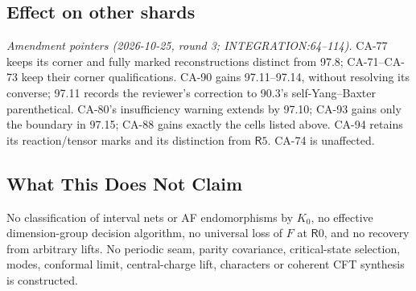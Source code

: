 \subsection{Effect on other shards}
\emph{Amendment pointers (2026-10-25, round 3; INTEGRATION:64--114).} CA-77 keeps its corner and fully marked
reconstructions distinct from 97.8; CA-71--CA-73 keep their corner qualifications. CA-90 gains 97.11--97.14,
without resolving its converse; 97.11 records the reviewer's correction to 90.3's self-Yang--Baxter parenthetical.
CA-80's insufficiency warning extends by 97.10; CA-93 gains only the boundary in 97.15; CA-88 gains exactly the
cells listed above. CA-94 retains its reaction/tensor marks and its distinction from \(\mathsf R5\). CA-74 is unaffected.

\subsection{What This Does Not Claim}
No classification of interval nets or AF endomorphisms by \(K_0\), no effective dimension-group decision algorithm,
no universal loss of \(F\) at \(\mathsf R0\), and no recovery from arbitrary lifts. No periodic seam, parity covariance,
critical-state selection, modes, conformal limit, central-charge lift, characters or coherent CFT synthesis is constructed.

